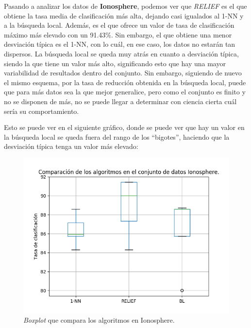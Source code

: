 \documentclass[11pt,a4paper]{article}
\begin{document}
Pasando a analizar los datos de \textbf{Ionosphere}, podemos ver que \textit{RELIEF} es el que obtiene la tasa media de
clasificación más alta, dejando casi igualados al 1-NN y a la búsqueda local. Además, es el que ofrece un valor de tasa
de clasificación máximo más elevado con un 91.43\%. Sin embargo, el que obtiene una menor desviación típica es el 1-NN, con
lo cuál, en ese caso, los datos no estarán tan dispersos. La búsqueda local se queda muy atrás en cuanto a desviación típica,
siendo la que tiene un valor más alto, significando esto que hay una mayor variabilidad de resultados dentro del conjunto.
Sin embargo, siguiendo de nuevo el mismo esquema, por la tasa de reducción obtenida en la búsqueda local, puede que para
más datos sea la que mejor generalice, pero como el conjunto es finito y no se disponen de más, no se puede llegar a
determinar con ciencia cierta cuál sería su comportamiento.

Esto se puede ver en el siguiente gráfico, donde se puede ver que hay un valor en la búsqueda local se queda fuera del
rango de los ``bigotes'', haciendo que la desviación típica tenga un valor más elevado:

\begin{figure}[H]
\centering
\includegraphics[scale=0.8]{img/boxplot.png}
\caption{\textit{Boxplot} que compara los algoritmos en Ionosphere.}
\end{figure}
\end{document}
